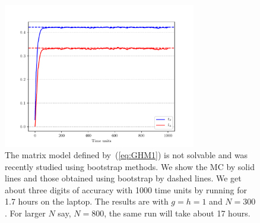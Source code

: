\documentclass[11pt]{article}
\begin{document}
\begin{figure}[htbp] 
	\centering 
	\includegraphics[width=0.75\textwidth]{figs/plot_2MM_sym1.pdf}
	\caption{\label{fig:2MM_match}The matrix model defined by~(\ref{eq:GHM1}) is not solvable and was 
		recently studied using bootstrap methods. We show the MC by solid lines and those obtained using bootstrap by dashed lines. We get about three digits of accuracy with 1000 time units by running for 1.7 hours on the laptop. The results are with $g=h=1$ and $N=300$. For larger $N$ say, $N=800$, the same run will take about 17 hours.}
\end{figure} 
\end{document}
